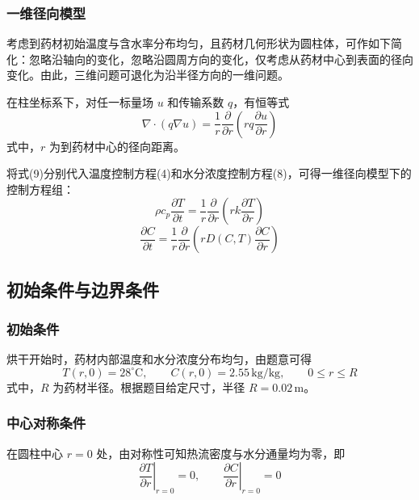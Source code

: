 \documentclass[withoutpreface,bwprint]{cumcm_thesis}
\begin{document}
\subsubsection{一维径向模型}

考虑到药材初始温度与含水率分布均匀，且药材几何形状为圆柱体，可作如下简化：忽略沿轴向的变化，忽略沿圆周方向的变化，仅考虑从药材中心到表面的径向变化。由此，三维问题可退化为沿半径方向的一维问题。

在柱坐标系下，对任一标量场 \(u\) 和传输系数 \(q\)，有恒等式
\begin{equation}
\nabla \cdot (q \nabla u) = \frac{1}{r} \frac{\partial}{\partial r} \left( r q \frac{\partial u}{\partial r} \right)
\end{equation}
式中，\(r\) 为到药材中心的径向距离。

将式(9)分别代入温度控制方程(4)和水分浓度控制方程(8)，可得一维径向模型下的控制方程组：
\begin{equation}
\rho c_p \frac{\partial T}{\partial t} = \frac{1}{r} \frac{\partial}{\partial r} \left( r k \frac{\partial T}{\partial r} \right)
\end{equation}
\begin{equation}
\frac{\partial C}{\partial t} = \frac{1}{r} \frac{\partial}{\partial r} \left( r D(C,T) \frac{\partial C}{\partial r} \right)
\end{equation}

\subsection{初始条件与边界条件}

\subsubsection{初始条件}

烘干开始时，药材内部温度和水分浓度分布均匀，由题意可得
\begin{equation}
T(r,0) = 28^\circ\text{C}, \qquad C(r,0) = 2.55\,\text{kg/kg}, \qquad 0 \le r \le R
\end{equation}
式中，\(R\) 为药材半径。根据题目给定尺寸，半径 \(R = 0.02\,\text{m}\)。

\subsubsection{中心对称条件}

在圆柱中心 \(r=0\) 处，由对称性可知热流密度与水分通量均为零，即
\begin{equation}
\left. \frac{\partial T}{\partial r} \right|_{r=0} = 0, \qquad \left. \frac{\partial C}{\partial r} \right|_{r=0} = 0
\end{equation}
\end{document}
